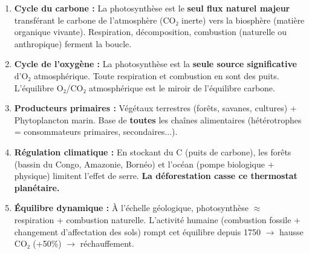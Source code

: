 \documentclass[11pt]{article}
\begin{document}
\begin{aretenir}
\begin{enumerate}
    \item \textbf{Cycle du carbone :} La photosynthèse est le \textbf{seul flux naturel majeur} transférant le carbone de l'atmosphère (CO₂ inerte) vers la biosphère (matière organique vivante). Respiration, décomposition, combustion (naturelle ou anthropique) ferment la boucle.
    \item \textbf{Cycle de l'oxygène :} La photosynthèse est la \textbf{seule source significative} d'O₂ atmosphérique. Toute respiration et combustion en sont des puits. L'équilibre O₂/CO₂ atmosphérique est le miroir de l'équilibre carbone.
    \item \textbf{Producteurs primaires :} Végétaux terrestres (forêts, savanes, cultures) + Phytoplancton marin. Base de \textbf{toutes} les chaînes alimentaires (hétérotrophes = consommateurs primaires, secondaires...).
    \item \textbf{Régulation climatique :} En stockant du C (puits de carbone), les forêts (bassin du Congo, Amazonie, Bornéo) et l'océan (pompe biologique + physique) limitent l'effet de serre. \textbf{La déforestation casse ce thermostat planétaire.}
    \item \textbf{Équilibre dynamique :} À l'échelle géologique, photosynthèse $\approx$ respiration + combustion naturelle. L'activité humaine (combustion fossile + changement d'affectation des sols) rompt cet équilibre depuis 1750 $\rightarrow$ hausse CO₂ (+50\%) $\rightarrow$ réchauffement.
\end{enumerate}
\end{aretenir}
\end{document}
